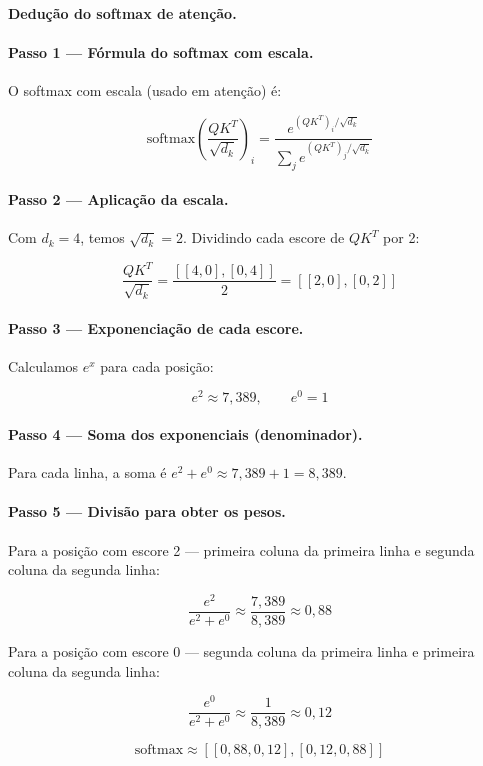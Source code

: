 \begin{metodo}
\textbf{Dedução do softmax de atenção.}

\paragraph{Passo 1 — Fórmula do softmax com escala.}
O softmax com escala (usado em atenção) é:

\[
\text{softmax}\left(\frac{QK^T}{\sqrt{d_k}}\right)_i = \frac{e^{(QK^T)_i / \sqrt{d_k}}}{\sum_j e^{(QK^T)_j / \sqrt{d_k}}}
\]

\paragraph{Passo 2 — Aplicação da escala.}
Com $d_k = 4$, temos $\sqrt{d_k} = 2$. Dividindo cada escore de $QK^T$ por 2:

\[
\frac{QK^T}{\sqrt{d_k}} = \frac{[[4, 0], [0, 4]]}{2} = [[2, 0], [0, 2]]
\]

\paragraph{Passo 3 — Exponenciação de cada escore.}
Calculamos $e^x$ para cada posição:

\[
e^2 \approx 7{,}389, \qquad e^0 = 1
\]

\paragraph{Passo 4 — Soma dos exponenciais (denominador).}
Para cada linha, a soma é $e^2 + e^0 \approx 7{,}389 + 1 = 8{,}389$.

\paragraph{Passo 5 — Divisão para obter os pesos.}
Para a posição com escore 2 — primeira coluna da primeira linha e segunda coluna da segunda linha:

\[
\frac{e^2}{e^2 + e^0} \approx \frac{7{,}389}{8{,}389} \approx 0{,}88
\]

Para a posição com escore 0 — segunda coluna da primeira linha e primeira coluna da segunda linha:

\[
\frac{e^0}{e^2 + e^0} \approx \frac{1}{8{,}389} \approx 0{,}12
\]

\[
\boxed{\text{softmax} \approx [[0{,}88, 0{,}12], [0{,}12, 0{,}88]]}
\]

\end{metodo}

